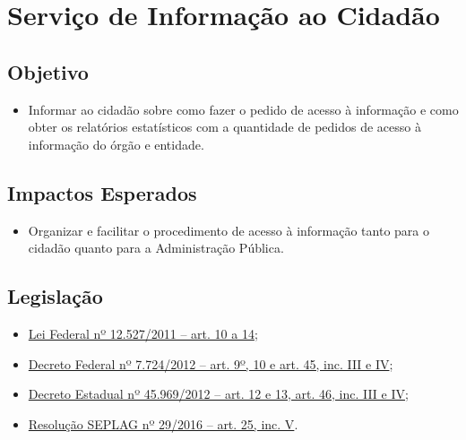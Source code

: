 \documentclass[
]{book}
\providecommand{\tightlist}{%
  \setlength{\itemsep}{0pt}\setlength{\parskip}{0pt}}
\begin{document}
\hypertarget{serviuxe7o-de-informauxe7uxe3o-ao-cidaduxe3o}{%
\section{Serviço de Informação ao Cidadão}\label{serviuxe7o-de-informauxe7uxe3o-ao-cidaduxe3o}}

\hypertarget{objetivo}{%
\subsection{Objetivo}\label{objetivo}}

\begin{itemize}
\tightlist
\item
  Informar ao cidadão sobre como fazer o pedido de acesso à informação e como obter os relatórios estatísticos com a quantidade de pedidos de acesso à informação do órgão e entidade.
\end{itemize}

\hypertarget{impactos-esperados-1}{%
\subsection{Impactos Esperados}\label{impactos-esperados-1}}

\begin{itemize}
\tightlist
\item
  Organizar e facilitar o procedimento de acesso à informação tanto para o cidadão quanto para a Administração Pública.
\end{itemize}

\hypertarget{legislauxe7uxe3o-1}{%
\subsection{Legislação}\label{legislauxe7uxe3o-1}}

\begin{itemize}
\tightlist
\item
  \href{http://www.planalto.gov.br/ccivil_03/_ato2011-2014/2011/lei/l12527.htm\#art10}{Lei Federal nº 12.527/2011 -- art. 10 a 14};
\item
  \href{http://www.planalto.gov.br/ccivil_03/_ato2011-2014/2012/decreto/d7724.htm}{Decreto Federal nº 7.724/2012 -- art. 9º, 10 e art. 45, inc. III e IV};
\item
  \href{https://www.almg.gov.br/consulte/legislacao/completa/completa.html?tipo=DEC\&num=45969\&ano=2012}{Decreto Estadual nº 45.969/2012 -- art. 12 e 13, art. 46, inc. III e IV};
\item
  \href{http://www.planejamento.mg.gov.br/sites/default/files/documentos/resolucao_sitios_seplag_29_de_05_07_2016_1.pdf}{Resolução SEPLAG nº 29/2016 -- art. 25, inc. V}.
\end{itemize}
\end{document}
